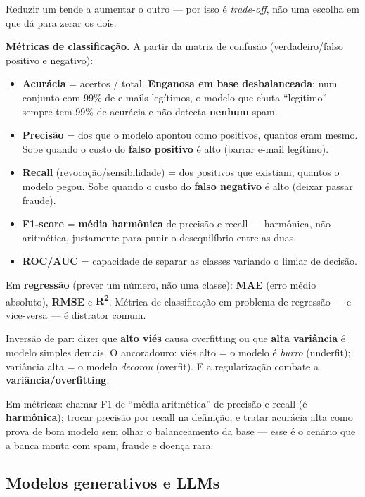 Reduzir um tende a aumentar o outro --- por isso é \emph{trade-off}, não uma
escolha em que dá para zerar os dois.

\textbf{Métricas de classificação.} A partir da matriz de confusão
(verdadeiro/falso positivo e negativo):

\begin{itemize}
\item \textbf{Acurácia} = acertos / total. \textbf{Enganosa em base
desbalanceada}: num conjunto com 99\% de e-mails legítimos, o modelo que
chuta ``legítimo'' sempre tem 99\% de acurácia e não detecta \textbf{nenhum}
spam.
\item \textbf{Precisão} = dos que o modelo apontou como positivos, quantos
eram mesmo. Sobe quando o custo do \textbf{falso positivo} é alto (barrar
e-mail legítimo).
\item \textbf{Recall} (revocação/sensibilidade) = dos positivos que existiam,
quantos o modelo pegou. Sobe quando o custo do \textbf{falso negativo} é alto
(deixar passar fraude).
\item \textbf{F1-score} = \textbf{média harmônica} de precisão e recall ---
harmônica, não aritmética, justamente para punir o desequilíbrio entre as
duas.
\item \textbf{ROC/AUC} = capacidade de separar as classes variando o limiar
de decisão.
\end{itemize}

Em \textbf{regressão} (prever um número, não uma classe): \textbf{MAE} (erro
médio absoluto), \textbf{RMSE} e \textbf{R\textsuperscript{2}}. Métrica de
classificação em problema de regressão --- e vice-versa --- é distrator
comum.

\begin{pegadinha}
Inversão de par: dizer que \textbf{alto viés} causa overfitting ou que
\textbf{alta variância} é modelo simples demais. O ancoradouro: viés alto =
o modelo é \emph{burro} (underfit); variância alta = o modelo \emph{decorou}
(overfit). E a regularização combate a \textbf{variância/overfitting}.

Em métricas: chamar F1 de ``média aritmética'' de precisão e recall (é
\textbf{harmônica}); trocar precisão por recall na definição; e tratar
acurácia alta como prova de bom modelo sem olhar o balanceamento da base ---
esse é o cenário que a banca monta com spam, fraude e doença rara.
\end{pegadinha}

\subsection{Modelos generativos e LLMs}

